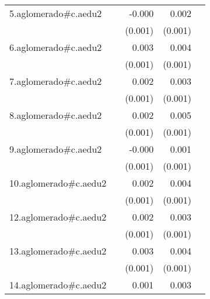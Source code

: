 {\begin{longtable}{l*{4}{D{.}{.}{-1}}}
\addlinespace
5.aglomerado#c.aedu2&                     &      -0.000         &       0.002\sym{*}  &                     \\
            &                     &     (0.001)         &     (0.001)         &                     \\
\addlinespace
6.aglomerado#c.aedu2&                     &       0.003\sym{*}  &       0.004\sym{***}&                     \\
            &                     &     (0.001)         &     (0.001)         &                     \\
\addlinespace
7.aglomerado#c.aedu2&                     &       0.002         &       0.003\sym{***}&                     \\
            &                     &     (0.001)         &     (0.001)         &                     \\
\addlinespace
8.aglomerado#c.aedu2&                     &       0.002         &       0.005\sym{***}&                     \\
            &                     &     (0.001)         &     (0.001)         &                     \\
\addlinespace
9.aglomerado#c.aedu2&                     &      -0.000         &       0.001         &                     \\
            &                     &     (0.001)         &     (0.001)         &                     \\
\addlinespace
10.aglomerado#c.aedu2&                     &       0.002         &       0.004\sym{***}&                     \\
            &                     &     (0.001)         &     (0.001)         &                     \\
\addlinespace
12.aglomerado#c.aedu2&                     &       0.002         &       0.003\sym{***}&                     \\
            &                     &     (0.001)         &     (0.001)         &                     \\
\addlinespace
13.aglomerado#c.aedu2&                     &       0.003\sym{*}  &       0.004\sym{***}&                     \\
            &                     &     (0.001)         &     (0.001)         &                     \\
\addlinespace
14.aglomerado#c.aedu2&                     &       0.001         &       0.003\sym{**} &                     \\

\end{longtable}}
